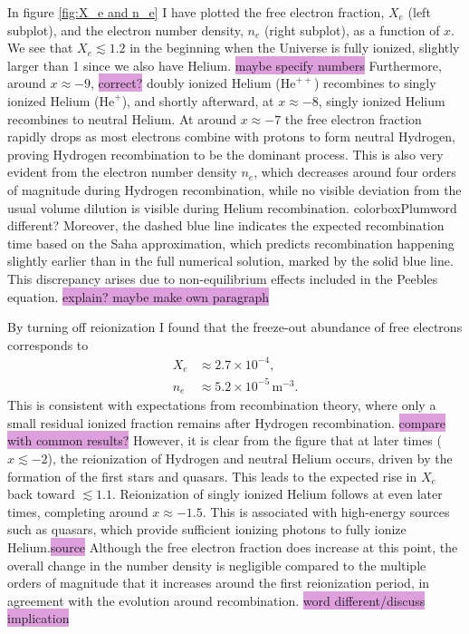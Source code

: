 \documentclass{aa}
\begin{document}
In figure \ref{fig:X_e and n_e} I have plotted the free electron fraction, $X_e$ (left subplot), and the electron number density, $n_e$ (right subplot), as a function of $x$. We see that $X_e \lesssim 1.2$ in the beginning when the Universe is fully ionized, slightly larger than 1 since we also have Helium. \colorbox{Plum}{maybe specify numbers} Furthermore, around 
$x \approx -9$, \colorbox{Plum}{correct?} doubly ionized Helium ($\text{He}^{++}$) recombines to singly ionized Helium ($\text{He}^+$), and shortly afterward, at $x \approx -8$, singly ionized Helium recombines to neutral Helium. At around $x\approx -7$ the free electron fraction rapidly drops as most electrons combine with protons to form neutral Hydrogen, proving Hydrogen recombination to be the dominant process. This is also very evident from the electron number density $n_e$, which decreases around four orders of magnitude during Hydrogen recombination, while no visible deviation from the usual volume dilution is visible during Helium recombination. colorbox{Plum}{word different?} Moreover, the dashed blue line indicates the expected recombination time based on the Saha approximation, which predicts recombination happening slightly earlier than in the full numerical solution, marked by the solid blue line. This discrepancy arises due to non-equilibrium effects included in the Peebles equation. \colorbox{Plum}{explain? maybe make own paragraph}

By turning off reionization I found that the freeze-out abundance of free electrons corresponds to
\begin{align*}
  X_e &\approx 2.7 \times10^{-4},
  \\
  n_e &\approx 5.2 \times10^{-5}\,\text{m}^{-3}.
\end{align*}
This is consistent with expectations from recombination theory, where only a small residual ionized fraction remains after Hydrogen recombination. \colorbox{Plum}{compare with common results?} However, it is clear from the figure that at later times ($x \lesssim -2$), the reionization of Hydrogen and neutral Helium occurs, driven by the formation of the first stars and quasars. This leads to the expected rise in $X_e$ back toward $\lesssim1.1$. Reionization of singly ionized Helium follows at even later times, completing around $x \approx -1.5$. This is associated with high-energy sources such as quasars, which provide sufficient ionizing photons to fully ionize Helium.\colorbox{Plum}{source} Although the free electron fraction does increase at this point, the overall change in the number density is negligible compared to the multiple orders of magnitude that it increases around the first reionization period, in agreement with the evolution around recombination. \colorbox{Plum}{word different/discuss implication}
\end{document}
